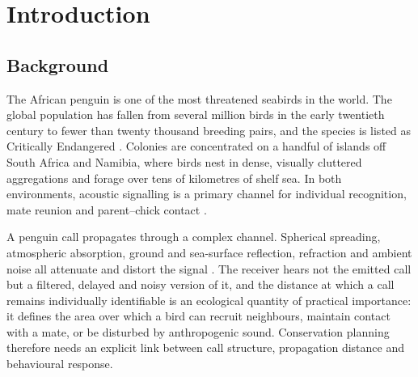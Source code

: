 \documentclass{apmcmthesis}
\begin{document}
\begin{abstract}
At the management level the index $I=F^{1/2}P^{1/2}$ is a symmetric composite that penalises failure in either component, but in the observed range fidelity is the binding constraint on the radius. In an illustrative allocation exercise, constrained optimisation of zone-specific buffers raises weighted coverage by $1.6\%$ over a uniform $150$ m policy and by $10.8\%$ at a $240$ m budget (an illustrative gain). The pipeline is a transferable template for acoustic conservation in other endangered seabirds.

\end{abstract}

\newpage
\begingroup
\fontsize{9}{11}\selectfont
\tableofcontents
\endgroup

\newpage
\pagestyle{mainmatterstyle}
\setcounter{page}{1}

\section{Introduction}

\subsection{Background}

The African penguin is one of the most threatened seabirds in the world. The global population has fallen from several million birds in the early twentieth century to fewer than twenty thousand breeding pairs, and the species is listed as Critically Endangered \cite{iucn2024}. Colonies are concentrated on a handful of islands off South Africa and Namibia, where birds nest in dense, visually cluttered aggregations and forage over tens of kilometres of shelf sea. In both environments, acoustic signalling is a primary channel for individual recognition, mate reunion and parent--chick contact \cite{aubin2002,favaro2014}.

A penguin call propagates through a complex channel. Spherical spreading, atmospheric absorption, ground and sea-surface reflection, refraction and ambient noise all attenuate and distort the signal \cite{wiley1978,forrest1994}. The receiver hears not the emitted call but a filtered, delayed and noisy version of it, and the distance at which a call remains individually identifiable is an ecological quantity of practical importance: it defines the area over which a bird can recruit neighbours, maintain contact with a mate, or be disturbed by anthropogenic sound. Conservation planning therefore needs an explicit link between call structure, propagation distance and behavioural response.
\end{document}
